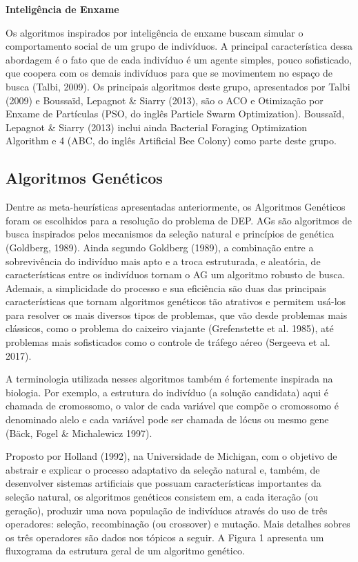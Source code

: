 \textbf{Inteligência de Enxame}

Os algoritmos inspirados por inteligência de enxame buscam simular o comportamento social de um grupo de indivíduos. A principal característica dessa abordagem é o fato que de cada indivíduo é um agente simples, pouco sofisticado, que coopera com os demais indivíduos para que se movimentem no espaço de busca (Talbi, 2009). Os principais algoritmos deste grupo, apresentados por Talbi (2009) e Boussaïd, Lepagnot \& Siarry (2013), são o ACO e Otimização por Enxame de Partículas (PSO, do inglês Particle Swarm Optimization). Boussaïd, Lepagnot \& Siarry (2013) inclui ainda Bacterial Foraging Optimization Algorithm e 4 (ABC, do inglês Artificial Bee Colony) como parte deste grupo.

\subsection{Algoritmos Genéticos}

Dentre as meta-heurísticas apresentadas anteriormente, os Algoritmos Genéticos foram os escolhidos para a resolução do problema de DEP. AGs são algoritmos de busca inspirados pelos mecanismos da seleção natural e princípios de genética (Goldberg, 1989). Ainda segundo Goldberg (1989), a combinação entre a sobrevivência do indivíduo mais apto e a troca estruturada, e aleatória, de características entre os indivíduos tornam o AG um algoritmo robusto de busca. Ademais, a simplicidade do processo e sua eficiência são duas das principais características que tornam algoritmos genéticos tão atrativos e permitem usá-los para resolver os mais diversos tipos de problemas, que vão desde problemas mais clássicos, como o problema do caixeiro viajante (Grefenstette et al. 1985), até problemas mais sofisticados como o controle de tráfego aéreo (Sergeeva et al. 2017). 

A terminologia utilizada nesses algoritmos também é fortemente inspirada na biologia. Por exemplo, a estrutura do indivíduo (a solução candidata) aqui é chamada de cromossomo, o valor de cada variável que compõe o cromossomo é denominado alelo e cada variável pode ser chamada de lócus ou mesmo gene (Bäck, Fogel \& Michalewicz 1997).

Proposto por Holland (1992), na Universidade de Michigan, com o objetivo de abstrair e explicar o processo adaptativo da seleção natural e, também, de desenvolver sistemas artificiais que possuam características importantes da seleção natural, os algoritmos genéticos consistem em, a cada iteração (ou geração), produzir uma nova população de indivíduos através do uso de três operadores: seleção, recombinação (ou crossover) e mutação. Mais detalhes sobres os três operadores são dados nos tópicos a seguir. A Figura 1 apresenta um fluxograma da estrutura geral de um algoritmo genético. 

